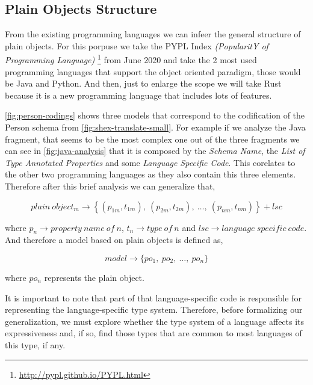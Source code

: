 \subsection{Plain Objects Structure}
From the existing programming languages we can infeer the general structure of plain objects. For this porpuse
we take the PYPL Index \textit{(PopularitY of Programming Language)} \footnote{\url{http://pypl.github.io/PYPL.html}}
from June 2020 and take the 2 most used programming languages that support the object oriented paradigm,
those would be Java and Python. And then, just to enlarge the scope we will take Rust because it is a new programming
language that includes lots of features.

\cref{fig:person-codings} shows three models that correspond to the codification of the Person schema from
\cref{fig:shex-translate-small}. For example if we analyze the Java fragment, that seems to be the most complex
one out of the three fragments we can see in \cref{fig:java-analysis} that it is composed by the \textit{Schema Name},
the \textit{List of Type Annotated Properties} and some \textit{Language Specific Code}. This corelates to the other
two programming languages as they also contain this three elements. Therefore after this brief analysis we can generalize that,

\begin{equation}\label{eq:plain-object}
    plain\ object_m \rightarrow \left \{ (p_{1m}, t_{1m}),\ (p_{2m}, t_{2m}),\ \dots,\ (p_{nm}, t_{nm}) \right \} + lsc
\end{equation}

where $p_n \rightarrow property\ name\ of\ n$, $t_n \rightarrow type\ of\ n$ and $lsc \rightarrow language\ specific\ code$.
And therefore a model based on plain objects is defined as,

\begin{equation}\label{eq:plain-object-model}
model \rightarrow \{ po_1,\ po_2,\ \dots,\ po_n \}
\end{equation}

where $po_n$ represents the plain object.

It is important to note that part of that language-specific code is responsible for representing the language-specific type system.
Therefore, before formalizing our generalization, we must explore whether the type system of a language affects its expressiveness
and, if so, find those types that are common to most languages of this type, if any.

